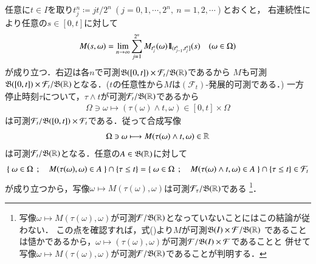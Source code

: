 	\begin{prf}
		任意に$t \in I$を取り$t_j^n \coloneqq jt/2^n\ (j=0,1,\cdots,2^n,\ n=1,2,\cdots)$とおくと，
		右連続性により任意の$s \in [0,t]$に対して
		\begin{align}
			M(s,\omega) = \lim_{n \to \infty} \sum_{j=1}^{2^n} M_{t_j^n}(\omega) \mbox{1}\hspace{-0.25em}\mbox{l}_{(t_{j-1}^n,t_j^n]}(s) \quad (\omega \in \Omega)
			\label{eq:stopping_time_measurability}
		\end{align}
		が成り立つ．右辺は各$n$で可測$\mathfrak{B}([0,t]) \times \mathcal{F}_t/\mathfrak{B}(\mathbb{R})$であるから
		$M$も可測$\mathfrak{B}([0,t]) \times \mathcal{F}_t/\mathfrak{B}(\mathbb{R})$となる．($t$の任意性から$M$は$(\mathcal{F}_t)$-発展的可測である．)
		一方停止時刻$\tau$について，$\tau \wedge t$が可測$\mathcal{F}_t/\mathfrak{B}(\mathbb{R})$であるから
		\begin{align}
			\Omega \ni \omega \longmapsto (\tau(\omega) \wedge t, \omega) \in [0,t] \times \Omega
		\end{align}
		は可測$\mathcal{F}_t/\mathfrak{B}([0,t]) \times \mathcal{F}_t$である．従って合成写像
		\begin{align}
			\Omega \ni \omega \longmapsto M(\tau(\omega) \wedge t,\omega) \in \mathbb{R}
		\end{align}
		は可測$\mathcal{F}_t/\mathfrak{B}(\mathbb{R})$となる．任意の$A \in \mathfrak{B}(\mathbb{R})$に対して
		\begin{align}
			\left\{\ \omega \in \Omega\ \, ; \quad M(\tau(\omega),\omega) \in A\ \right\} \cap \left\{ \tau \leq t \right\}
			= \left\{\ \omega \in \Omega\ \, ; \quad M(\tau(\omega) \wedge t,\omega) \in A\ \right\} \cap \left\{ \tau \leq t \right\}
			\in \mathcal{F}_t
		\end{align}
		が成り立つから，写像$\omega \longmapsto M(\tau(\omega),\omega)$は可測$\mathcal{F}_\tau/\mathfrak{B}(\mathbb{R})$である
		\footnote{
			写像$\omega \longmapsto M(\tau(\omega),\omega)$が可測$\mathcal{F}/\mathfrak{B}(\mathbb{R})$となっていないことにはこの結論が従わない．
			この点を確認すれば，式()より$M$が可測$\mathfrak{B}(I) \times \mathcal{F}/\mathfrak{B}(\mathbb{R})$
			であることは慥かであるから，$\omega \longmapsto (\tau(\omega),\omega)$が可測$\mathcal{F}/\mathfrak{B}(I)\times\mathcal{F}$であることと
			併せて写像$\omega \longmapsto M(\tau(\omega),\omega)$が可測$\mathcal{F}/\mathfrak{B}(\mathbb{R})$であることが判明する．
		}．
		\QED
	\end{prf}
	
